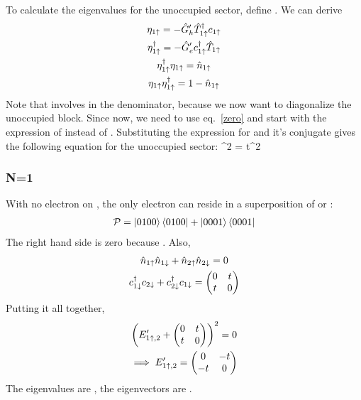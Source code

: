 \documentclass[12pt]{article}
\begin{document}
\subsection{}
To calculate the eigenvalues for the unoccupied sector, define . We can derive
\begin{gather}
    \eta_{1\uparrow} = -\hat G_h^\prime \hat T_{1\uparrow}^\dagger c_{1\uparrow}\label{now} \\
        \eta^\dagger_{1\uparrow} = -\hat G_e^\prime c_{1\uparrow}^\dagger\hat T_{1\uparrow}\label{etad2}\\
        \eta^\dagger_{1\uparrow}\eta_{1\uparrow}=\hat n_{1\uparrow} \\
        \eta_{1\uparrow}\eta^\dagger_{1\uparrow}=1-\hat n_{1\uparrow}\label{zero}
\end{gather}
Note that  involves  in the denominator, because we now want to diagonalize the unoccupied block. Since  now, we need to use eq.~\ref{zero} and start with the expression of  instead of \il{\eta^\dagger_{1\ua}}. Substituting the expression for \il{\eta_{1\ua}} and it's conjugate gives the following equation for the unoccupied sector:
\beq
{}^2 = t^2 \nc
\eeq
\subsubsection{N=1}
With no electron on , the only electron can reside in a superposition of  or :
\begin{gather}
    \mathcal{P} = \ket{0100}\bra{0100} + \ket{0001}\bra{0001}
\end{gather}
The right hand side is zero because . Also,
\begin{gather}
    \hat n_{1\uparrow}\hat n_{1\downarrow}+\hat n_{2\uparrow}\hat n_{2\downarrow} = 0\\
    c_{1\downarrow}^\dagger c_{2\downarrow}+c_{2\downarrow}^\dagger c_{1\downarrow} = \begin{pmatrix} 0 & t \\ t & 0 \end{pmatrix}
\end{gather}
Putting it all together,
\begin{gather}
    \left({E^\prime_{1\uparrow,2}+ \begin{pmatrix} 0 & t \\ t & 0 \end{pmatrix}}\right)^2 = 0 \\
    \implies E^\prime_{1\uparrow,2}= \begin{pmatrix} 0 & -t \\ -t & 0 \end{pmatrix}\label{eval}
\end{gather}
The eigenvalues are , the eigenvectors are . 
\end{document}
